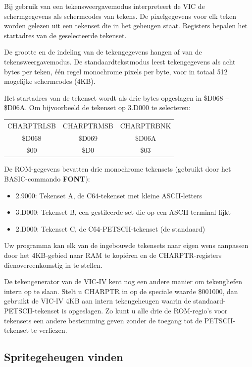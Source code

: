 Bij gebruik van een tekensweergavemodus interpreteert de VIC de schermgegevens als schermcodes van tekens. De pixelgegevens voor elk teken worden gelezen uit een tekenset die in het geheugen staat. Registers bepalen het startadres van de geselecteerde tekenset.

De grootte en de indeling van de tekengegevens hangen af van de tekensweergavemodus. De standaardtekstmodus leest tekengegevens als acht bytes per teken, één regel monochrome pixels per byte, voor in totaal 512 mogelijke schermcodes (4KB).

Het startadres van de tekenset wordt als drie bytes opgeslagen in \$D068 -- \$D06A. Om bijvoorbeeld de tekenset op 3.D000 te selecteren:

\begin{center}
\begin{tabular}{|c|c|c|}
\hline
CHARPTRLSB & CHARPTRMSB & CHARPTRBNK \\\$D068 & \$D069 & \$D06A \\
\hline
\$00 & \$D0 & \$03 \\
\hline
\end{tabular}
\end{center}

De ROM-gegevens bevatten drie monochrome tekensets (gebruikt door het BASIC-commando {\bf FONT}):

\begin{itemize}
\item 2.9000: Tekenset A, de C64-tekenset met kleine ASCII-letters\item 3.D000: Tekenset B, een gestileerde set die op een ASCII-terminal lijkt\item 2.D000: Tekenset C, de C64-PETSCII-tekenset (de standaard)
\end{itemize}

Uw programma kan elk van de ingebouwde tekensets naar eigen wens aanpassen door het 4KB-gebied naar RAM te kopiëren en de CHARPTR-registers dienovereenkomstig in te stellen.

De tekengenerator van de VIC-IV kent nog een andere manier om tekengliefen intern op te slaan. Stelt u CHARPTR in op de speciale waarde \$001000, dan gebruikt de VIC-IV 4KB aan intern tekengeheugen waarin de standaard-PETSCII-tekenset is opgeslagen. Zo kunt u alle drie de ROM-regio's voor tekensets een andere bestemming geven zonder de toegang tot de PETSCII-tekenset te verliezen.

\subsection{Spritegeheugen vinden}


